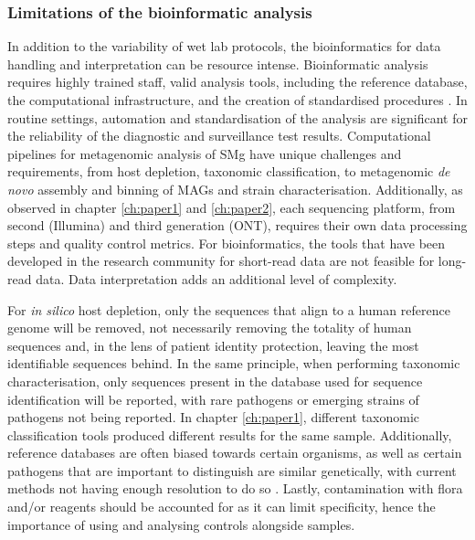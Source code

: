 \subsubsection{Limitations of the bioinformatic analysis}

In addition to the variability of wet lab protocols, the bioinformatics for data handling and interpretation can be resource intense. Bioinformatic analysis requires highly trained staff, valid analysis tools, including the reference database, the computational infrastructure, and the creation of standardised procedures \citep{petersen_third-generation_2019}. In routine settings, automation and standardisation of the analysis are significant for the reliability of the diagnostic and surveillance test results. Computational pipelines for metagenomic analysis of \ac{SMg} have unique challenges and requirements, from host depletion, taxonomic classification, to metagenomic \textit{de novo} assembly and binning of \ac{MAG}s and strain characterisation. Additionally, as observed in chapter \ref{ch:paper1} and \ref{ch:paper2}, each sequencing platform, from second (Illumina) and third generation (\ac{ONT}), requires their own data processing steps and quality control metrics. For bioinformatics, the tools that have been developed in the research community for short-read data are not feasible for long-read data. Data interpretation adds an additional level of complexity.  

For \textit{in silico} host depletion, only the sequences that align to a human reference genome will be removed, not necessarily removing the totality of human sequences and, in the lens of patient identity protection, leaving the most identifiable sequences behind. In the same principle, when performing taxonomic characterisation, only sequences present in the database used for sequence identification will be reported, with rare pathogens or emerging strains of pathogens not being reported. In chapter \ref{ch:paper1}, different taxonomic classification tools produced different results for the same sample. Additionally, reference databases are often biased towards certain organisms, as well as certain pathogens that are important to distinguish are similar genetically, with current methods not having enough resolution to do so \citep{gu_clinical_2019}. Lastly, contamination with flora and/or reagents should be accounted for as it can limit specificity, hence the importance of using and analysing controls alongside samples. 

